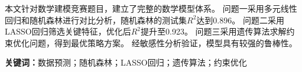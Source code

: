 本文针对数学建模竞赛题目，建立了完整的数学模型体系。
问题一采用多元线性回归和随机森林进行对比分析，随机森林的测试集$R^2$达到0.896。
问题二采用LASSO回归筛选关键特征，优化后$R^2$提升至0.923。
问题三采用遗传算法求解约束优化问题，得到最优策略方案。
经敏感性分析验证，模型具有较强的鲁棒性。

\noindent\textbf{关键词：}数据预测；随机森林；LASSO回归；遗传算法；约束优化
